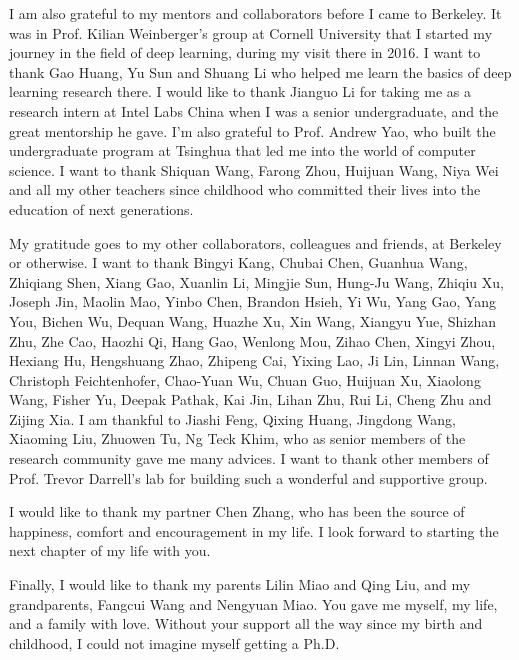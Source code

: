 \documentclass{ucbthesis}
\begin{document}
\begin{frontmatter}
\begin{acknowledgements}
I am also grateful to my mentors and collaborators before I came to Berkeley. It was in Prof. Kilian Weinberger's group at Cornell University that I started my journey in the field of deep learning, during my visit there in 2016. I want to thank Gao Huang, Yu Sun and Shuang Li who helped me learn the basics of deep learning research there. I would like to thank Jianguo Li for taking me as a research intern at Intel Labs China when I was a senior undergraduate, and the great mentorship he gave. I'm also grateful to Prof. Andrew Yao, who built the undergraduate program at Tsinghua that led me into the world of computer science. I want to thank Shiquan Wang, Farong Zhou, Huijuan Wang, Niya Wei and all my other teachers since childhood who committed their lives into the education of next generations.

My gratitude goes to my other collaborators, colleagues and friends, at Berkeley or otherwise. I want to thank Bingyi Kang, Chubai Chen, Guanhua Wang, Zhiqiang Shen, Xiang Gao, 
Xuanlin Li, Mingjie Sun, Hung-Ju Wang, Zhiqiu Xu, Joseph Jin, Maolin Mao, Yinbo Chen, Brandon Hsieh, 
Yi Wu, Yang Gao, Yang You, Bichen Wu, Dequan Wang, Huazhe Xu, Xin Wang, Xiangyu Yue, Shizhan Zhu, Zhe Cao, Haozhi Qi, Hang Gao, Wenlong Mou, Zihao Chen, 
Xingyi Zhou, Hexiang Hu, Hengshuang Zhao, Zhipeng Cai, Yixing Lao, Ji Lin, Linnan Wang, 
Christoph Feichtenhofer, Chao-Yuan Wu, Chuan Guo, Huijuan Xu, Xiaolong Wang, Fisher Yu, Deepak Pathak,
 Kai Jin, Lihan Zhu, Rui Li, Cheng Zhu and Zijing Xia.
 I am thankful to Jiashi Feng, Qixing Huang, Jingdong Wang, Xiaoming Liu, Zhuowen Tu, Ng Teck Khim, who as senior members of the research community gave me many advices. I want to thank other members of Prof. Trevor Darrell's lab for building such a wonderful and supportive group.

 I would like to thank my partner Chen Zhang, who has been the source of happiness, comfort and encouragement in my life. I look forward to starting the next chapter of my life with you.


Finally, I would like to thank my parents Lilin Miao and Qing Liu, and my grandparents, Fangcui Wang and Nengyuan Miao. You gave me myself, my life, and a family with love. Without your support all the way since my birth and childhood, I could not imagine myself getting a Ph.D.




\end{acknowledgements}

\end{frontmatter}
\end{document}
